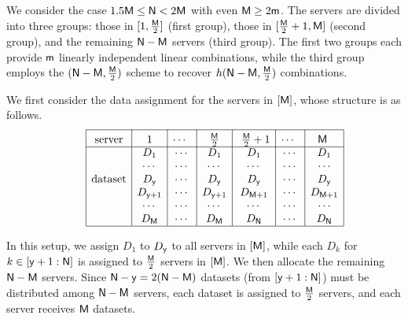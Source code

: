 \documentclass[conference,letterpaper]{IEEEtran}
\begin{document}
\label{sub:M is even}

We consider the case \(1.5 {\sf M} \leq {\sf N} < 2 {\sf M}\) with even \({\sf M} \geq 2{\sf m}\). The servers are divided into three groups: those in \([1, \tfrac{{\sf M}}{2}]\) (first group), those in \([\tfrac{{\sf M}}{2}+1, {\sf M}]\) (second group), and the remaining \({\sf N} - {\sf M}\) servers (third group). The first two groups each provide \({\sf m}\) linearly independent linear combinations, while the third group employs the \(({\sf N} - {\sf M}, \tfrac{{\sf M}}{2})\) scheme to recover \(h({\sf N} - {\sf M}, \tfrac{{\sf M}}{2})\) combinations.



We first consider the data assignment for the servers in $[{\sf M}]$, whose structure is as follows.
\begin{align*}
\begin{array}{rl|c|c|c|c|c|c|c|}\cline{3-3}\cline{4-4}\cline{5-5}\cline{6-6}\cline{7-7}\cline{8-8}\cline{9-9}
&&\rule{0pt}{1.2em}\mbox{server}&\rule{0pt}{1.2em}\mbox{1} &\rule{0pt}{1.2em}\mbox{$\cdots$ } &  \rule{0pt}{1.2em}\mbox{ $\frac{\Msf}{2}$ } & \rule{0pt}{1.2em}\mbox{ $\frac{\Msf}{2}  +1$}&  \rule{0pt}{1.2em}\mbox{$\cdots$ } &  \rule{0pt}{1.2em}\mbox{$\Msf$ }\\ 
\cline{3-3}\cline{4-4}\cline{5-5}\cline{6-6}\cline{7-7}\cline{8-8}\cline{9-9}
&& &D_1 & \cdots & D_1 & D_1 & \cdots & D_1 \\
&& &\cdots & \cdots & \cdots & \cdots & \cdots & \cdots \\ 
&& \mbox{dataset}&D_{\ysf} & \cdots & D_{\ysf} & D_{\ysf} & \cdots & D_{\ysf} \\
&& &D_{\ysf+1} & \cdots & D_{\ysf+1} & D_{\Msf+1} & \cdots & D_{\Msf+1} \\ 
&& &\cdots & \cdots & \cdots & \cdots & \cdots & \cdots \\
&& &D_{\Msf} & \cdots & D_{\Msf}&  D_{\Nsf} & \cdots & D_{\Nsf}\\  
\cline{3-3}\cline{4-4}\cline{5-5}\cline{6-6}\cline{7-7}\cline{8-8}\cline{9-9}
\end{array}
\end{align*}


In this setup, we assign \(D_1\) to \(D_{{\sf y}}\) to all servers in \([{\sf M}]\), while each \(D_k\) for \(k \in [{\sf y}+1 : {\sf N}]\) is assigned to \(\frac{{\sf M}}{2}\) servers in \([{\sf M}]\). We then allocate the remaining \({\sf N}-{\sf M}\) servers. Since \({\sf N}-{\sf y} = 2({\sf N}-{\sf M})\) datasets (from \([{\sf y}+1 : {\sf N}]\)) must be distributed among \({\sf N}-{\sf M}\) servers, each dataset is assigned to \(\frac{{\sf M}}{2}\) servers, and each server receives \({\sf M}\) datasets. 
\end{document}
